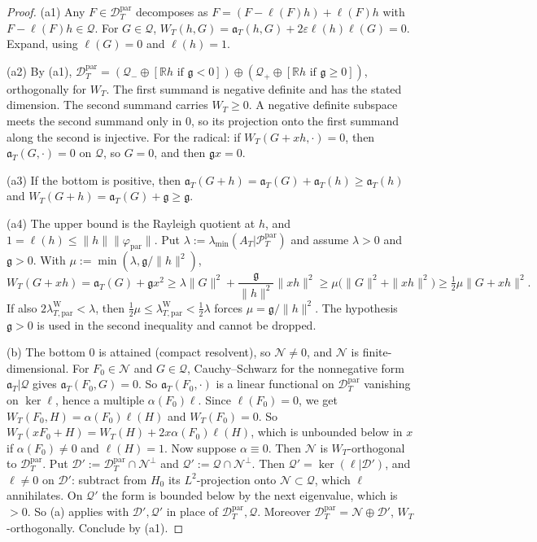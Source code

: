 \documentclass[11pt]{amsart}
\theoremstyle{definition}
\theoremstyle{remark}
\newcommand{\R}{\mathbb R}
\newcommand{\PT}{\mathcal P_T}
\begin{document}
\begin{proof}
(a1) Any $F\in\mathcal D^{\mathrm{par}}_T$ decomposes as $F=(F-\ell(F)h)+\ell(F)h$ with $F-\ell(F)h\in\mathcal Q$. For
$G\in\mathcal Q$, $W_T(h,G)=\mathfrak a_T(h,G)+2\varepsilon\ell(h)\ell(G)=0$. Expand, using $\ell(G)=0$ and $\ell(h)=1$.

(a2) By (a1), $\mathcal D^{\mathrm{par}}_T=(\mathcal Q_-\oplus[\R h\text{ if }\mathfrak g<0])\oplus(\mathcal Q_+\oplus[\R h\text{ if }\mathfrak g\ge0])$,
orthogonally for $W_T$. The first summand is negative definite and has the stated dimension. The second
summand carries $W_T\ge0$. A negative definite subspace meets the second summand only in $0$, so its
projection onto the first summand along the second is injective. For the radical: if
$W_T(G+xh,\cdot)=0$, then $\mathfrak a_T(G,\cdot)=0$ on $\mathcal Q$, so $G=0$, and then $\mathfrak g x=0$.

(a3) If the bottom is positive, then $\mathfrak a_T(G+h)=\mathfrak a_T(G)+\mathfrak a_T(h)\ge\mathfrak a_T(h)$ and
$W_T(G+h)=\mathfrak a_T(G)+\mathfrak g\ge\mathfrak g$.

(a4) The upper bound is the Rayleigh quotient at $h$, and $1=\ell(h)\le\|h\|\|\varphi_{\mathrm{par}}\|$. Put
$\lambda:=\lambda_{\min}(A_T|\PT^{\mathrm{par}})$ and assume $\lambda>0$ and $\mathfrak g>0$. With
$\mu:=\min(\lambda,\mathfrak g/\|h\|^2)$,
\[
W_T(G+xh)=\mathfrak a_T(G)+\mathfrak gx^2\ge\lambda\|G\|^2+\frac{\mathfrak g}{\|h\|^2}\|xh\|^2
\ge\mu\big(\|G\|^2+\|xh\|^2\big)\ge\tfrac12\mu\|G+xh\|^2 .
\]
If also $2\lambda^{\mathrm W}_{T,\mathrm{par}}<\lambda$, then $\frac12\mu\le\lambda^{\mathrm W}_{T,\mathrm{par}}<\frac12\lambda$ forces
$\mu=\mathfrak g/\|h\|^2$. The hypothesis $\mathfrak g>0$ is used in the second inequality and cannot be dropped.

(b) The bottom $0$ is attained (compact resolvent), so $\mathcal N\ne0$, and $\mathcal N$ is finite-dimensional. For
$F_0\in\mathcal N$ and $G\in\mathcal Q$, Cauchy--Schwarz for the nonnegative form $\mathfrak a_T|\mathcal Q$ gives
$\mathfrak a_T(F_0,G)=0$. So $\mathfrak a_T(F_0,\cdot)$ is a linear functional on $\mathcal D^{\mathrm{par}}_T$ vanishing on
$\ker\ell$, hence a multiple $\alpha(F_0)\ell$. Since $\ell(F_0)=0$, we get $W_T(F_0,H)=\alpha(F_0)\ell(H)$ and
$W_T(F_0)=0$. So $W_T(xF_0+H)=W_T(H)+2x\alpha(F_0)\ell(H)$, which is unbounded below in $x$ if
$\alpha(F_0)\ne0$ and $\ell(H)=1$. Now suppose $\alpha\equiv0$. Then $\mathcal N$ is $W_T$-orthogonal to
$\mathcal D^{\mathrm{par}}_T$. Put $\mathcal D':=\mathcal D^{\mathrm{par}}_T\cap\mathcal N^\perp$ and $\mathcal Q':=\mathcal Q\cap\mathcal N^\perp$.
Then $\mathcal Q'=\ker(\ell|\mathcal D')$, and $\ell\ne0$ on $\mathcal D'$: subtract from $H_0$ its $L^2$-projection onto
$\mathcal N\subset\mathcal Q$, which $\ell$ annihilates. On $\mathcal Q'$ the form is bounded below by the next eigenvalue,
which is $>0$. So (a) applies with $\mathcal D',\mathcal Q'$ in place of $\mathcal D^{\mathrm{par}}_T,\mathcal Q$. Moreover
$\mathcal D^{\mathrm{par}}_T=\mathcal N\oplus\mathcal D'$, $W_T$-orthogonally. Conclude by (a1).


\end{proof}
\end{document}
